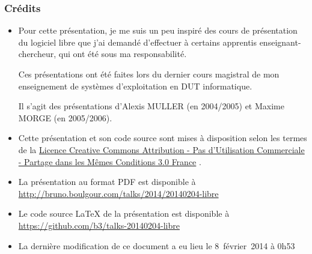 \documentclass[10pt]{beamer}
\begin{document}
\begin{frame}
  \frametitle{Crédits}

  \small

  \begin{itemize}
  \item Pour cette présentation, je me suis un peu inspiré des cours de
    présentation du logiciel libre que j'ai demandé d'effectuer à certains
    apprentis enseignant-chercheur, qui ont été sous ma responsabilité.

    Ces présentations ont été faites lors du dernier cours magistral de mon
    enseignement de systèmes d'exploitation en DUT informatique.

    Il s'agit des présentations d'Alexis MULLER (en 2004/2005) et Maxime
    MORGE (en 2005/2006).
  
    \vfill
    
  \item Cette présentation et son code source sont mises à disposition
    selon les termes de la
    \href{https://creativecommons.org/licenses/by-nc-sa/3.0/fr/legalcode}{Licence
      Creative Commons Attribution - Pas d’Utilisation Commerciale - Partage
      dans les Mêmes Conditions 3.0 France} \ccbyncsa.

    \vfill

  \item La présentation au format PDF est disponible à \url{http://bruno.boulgour.com/talks/2014/20140204-libre}

    \vfill

  \item Le code source LaTeX de la présentation est disponible à \url{https://github.com/b3/talks-20140204-libre}

  \item La dernière modification de ce document a eu lieu le 8~février~2014 à 0h53 %
  \end{itemize}
\end{frame}
\end{document}

